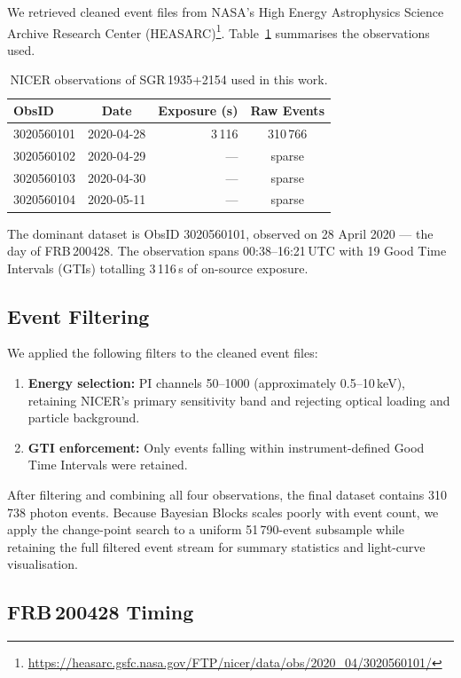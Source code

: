\documentclass[12pt]{article}
\begin{document}
We retrieved cleaned event files from NASA's High Energy Astrophysics
Science Archive Research Center (HEASARC)\footnote{%
\url{https://heasarc.gsfc.nasa.gov/FTP/nicer/data/obs/2020_04/3020560101/}}.
Table~\ref{tab:obs} summarises the observations used.

\begin{table}[H]
\centering
\caption{NICER observations of SGR\,1935+2154 used in this work.}
\label{tab:obs}
\begin{tabular}{@{}lcrc@{}}
\toprule
ObsID & Date & Exposure (s) & Raw Events \\
\midrule
3020560101 & 2020-04-28 & 3\,116 & 310\,766 \\
3020560102 & 2020-04-29 & --- & sparse \\
3020560103 & 2020-04-30 & --- & sparse \\
3020560104 & 2020-05-11 & --- & sparse \\
\bottomrule
\end{tabular}
\end{table}

The dominant dataset is ObsID 3020560101, observed on 28 April 2020 ---
the day of FRB\,200428. The observation spans 00:38--16:21\,UTC with 19
Good Time Intervals (GTIs) totalling 3\,116\,s of on-source exposure.

\subsection{Event Filtering}

We applied the following filters to the cleaned event files:
\begin{enumerate}
    \item \textbf{Energy selection:} PI channels 50--1000
          (approximately 0.5--10\,keV), retaining NICER's primary
          sensitivity band and rejecting optical loading and particle
          background.
    \item \textbf{GTI enforcement:} Only events falling within
          instrument-defined Good Time Intervals were retained.
\end{enumerate}
After filtering and combining all four observations, the final dataset
contains 310\,738 photon events. Because Bayesian Blocks scales poorly with
event count, we apply the change-point search to a uniform 51\,790-event
subsample while retaining the full filtered event stream for summary
statistics and light-curve visualisation.

\subsection{FRB\,200428 Timing}
\end{document}

